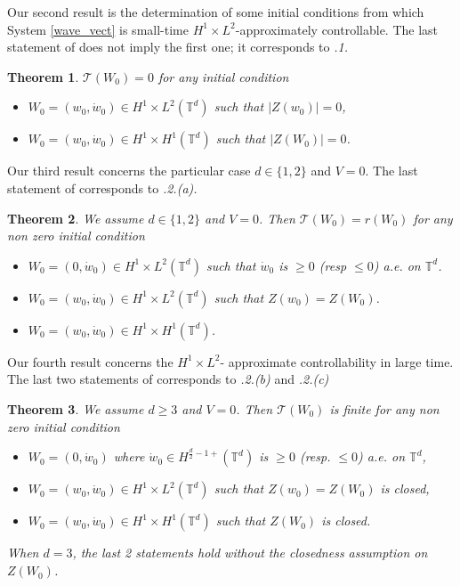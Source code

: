 \documentclass[a4paper]{article}
\theoremstyle{plain}
\newtheorem{theorem}{Theorem}
\newcommand{\T}{\mathbb{T}}
\begin{document}
Our second result is the determination of some initial conditions from which System \eqref{wave_vect} is small-time $H^1 \times L^2$-approximately controllable. The last statement of  does not imply the first one; it corresponds to \emph{.1.}

\begin{theorem} \label{Prop:STAC}
$\mathcal{T}(W_0)=0$ for any initial condition
\begin{itemize}[topsep=0cm, parsep=0cm, itemsep=0cm]
%
\item $W_0=(w_0,\dot{w}_0) \in H^1 \times L^2(\T^d)$ such that $|Z(w_0)|=0$,
%
\item $W_0=(w_0,\dot{w}_0) \in H^1 \times H^1(\T^d)$ such that $|Z(W_0)|=0$.
\end{itemize}
\end{theorem}

Our third result concerns the particular case $d \in \{1,2\}$ and $V=0$. The last statement of  corresponds to \emph{.2.(a).}

\begin{theorem} \label{Prop:Tmin}
We assume $d \in \{1,2\}$ and $V =0$.  
Then $\mathcal{T}(W_0)=r(W_0)$ for any non zero initial condition
\begin{itemize}[topsep=0cm, parsep=0cm, itemsep=0cm]
%
\item $W_0=(0,\dot{w}_0) \in H^1 \times L^2(\T^d)$ such that 
$\dot{w}_0$ is $\geq 0$  (resp $\leq 0$) a.e. on $\T^d$.
% 
\item $W_0=(w_0,\dot{w}_0) \in H^1 \times L^2(\T^d)$ such that $Z(w_0)=Z(W_0)$.
% 
\item $W_0=(w_0,\dot{w}_0) \in H^1 \times H^1(\T^d)$.
% 
\end{itemize}
\end{theorem}


Our fourth result concerns the $H^1 \times L^2$- approximate controllability in large time. The last two statements of  corresponds to \emph{.2.(b)} and \emph{.2.(c)} 

\begin{theorem} \label{Prop:large_time}
We assume $d \geq 3$ and $V=0$. Then $\mathcal{T}(W_0)$ is finite for any non zero initial condition
\begin{itemize}[topsep=0cm, parsep=0cm, itemsep=0cm]
%
\item $W_0=(0,\dot{w}_0)$ where 
$\dot{w}_0 \in H^{\frac{d}{2}-1+}(\T^d)$ is $\geq 0$ (resp. $\leq 0$) a.e. on $\T^d$,
% 
\item $W_0=(w_0,\dot{w}_0) \in H^1 \times L^2(\T^d)$ such that $Z(w_0)=Z(W_0)$ is closed,
% 
\item $W_0=(w_0,\dot{w}_0) \in H^1 \times H^1(\T^d)$ such that $Z(W_0)$ is closed.
% 
\end{itemize}
When $d=3$, the last 2 statements hold without the closedness assumption on $Z(W_0)$.
\end{theorem}
\end{document}
